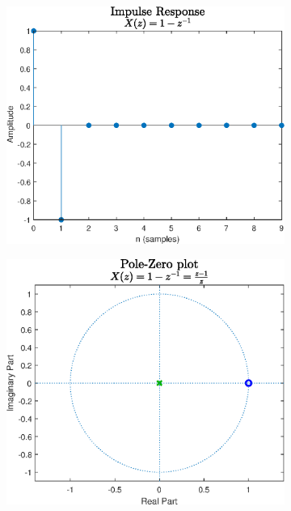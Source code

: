 \begin{figure}
\centering
\begin{subfigure}{.5\linewidth}
\centering
\includegraphics[scale=0.45]{images/impulse_response_1.eps}
\caption{}
\label{fig:sub1}
\end{subfigure}%
\begin{subfigure}{.5\linewidth}
\centering
\includegraphics[scale=0.45]{images/pole_zero_1.eps}
\caption{}
\label{fig:sub2}
\end{subfigure}\\[1ex]

\end{figure}
